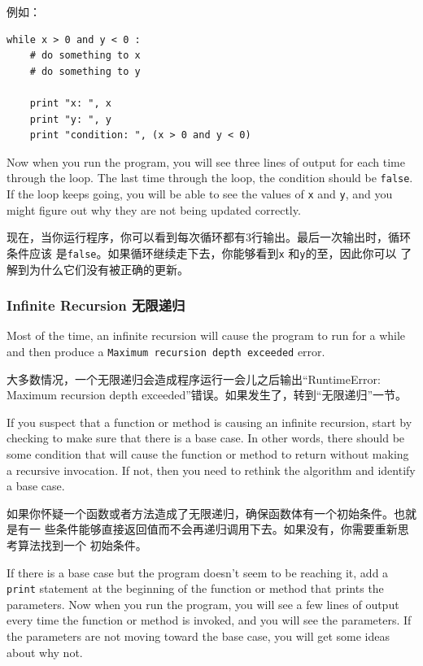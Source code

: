 \documentclass[10pt]{book}
\begin{document}
\begin{CJK}{UTF8}{gbsn}
例如：

\begin{verbatim}
while x > 0 and y < 0 :
    # do something to x
    # do something to y

    print "x: ", x
    print "y: ", y
    print "condition: ", (x > 0 and y < 0)
\end{verbatim}
%
Now when you run the program, you will see three lines of output
for each time through the loop.  The last time through the
loop, the condition should be {\tt false}.  If the loop keeps
going, you will be able to see the values of {\tt x} and {\tt y},
and you might figure out why they are not being updated correctly.

现在，当你运行程序，你可以看到每次循环都有3行输出。最后一次输出时，循环条件应该
是{\tt false}。如果循环继续走下去，你能够看到{\tt x} 和{\tt y}的至，因此你可以
了解到为什么它们没有被正确的更新。

\subsubsection{Infinite Recursion 无限递归}

Most of the time, an infinite recursion will cause the program to run
for a while and then produce a {\tt Maximum recursion depth exceeded}
error.

大多数情况，一个无限递归会造成程序运行一会儿之后输出``RuntimeError: Maximum
recursion depth exceeded''错误。如果发生了，转到``无限递归''一节。

If you suspect that a function or method is causing an infinite
recursion, start by checking to make sure that there is a base case.
In other words, there should be some condition that will cause the
function or method to return without making a recursive invocation.
If not, then you need to rethink the algorithm and identify a base
case.

如果你怀疑一个函数或者方法造成了无限递归，确保函数体有一个初始条件。也就是有一
些条件能够直接返回值而不会再递归调用下去。如果没有，你需要重新思考算法找到一个
初始条件。

If there is a base case but the program doesn't seem to be reaching
it, add a {\tt print} statement at the beginning of the function or method
that prints the parameters.  Now when you run the program, you will see
a few lines of output every time the function or method is invoked,
and you will see the parameters.  If the parameters are not moving
toward the base case, you will get some ideas about why not.


\end{CJK}
\end{document}
